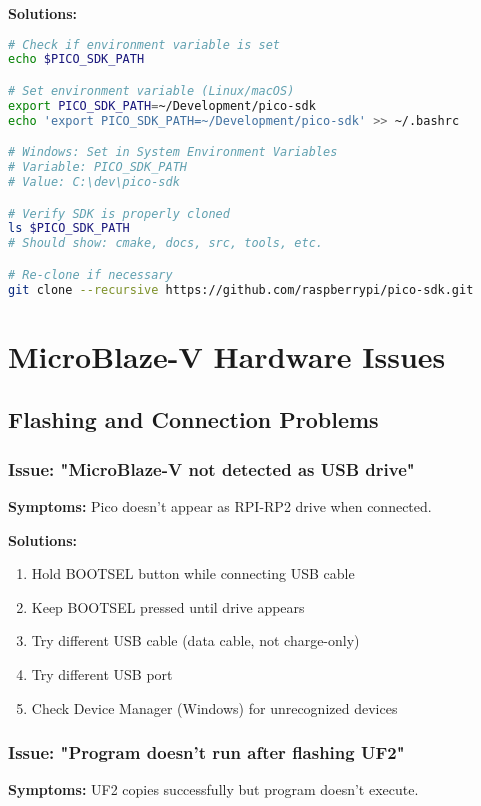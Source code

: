 \documentclass[11pt,a4paper]{article}
\begin{document}
\textbf{Solutions:}
\begin{lstlisting}[language=bash]
# Check if environment variable is set
echo $PICO_SDK_PATH

# Set environment variable (Linux/macOS)
export PICO_SDK_PATH=~/Development/pico-sdk
echo 'export PICO_SDK_PATH=~/Development/pico-sdk' >> ~/.bashrc

# Windows: Set in System Environment Variables
# Variable: PICO_SDK_PATH
# Value: C:\dev\pico-sdk

# Verify SDK is properly cloned
ls $PICO_SDK_PATH
# Should show: cmake, docs, src, tools, etc.

# Re-clone if necessary
git clone --recursive https://github.com/raspberrypi/pico-sdk.git
\end{lstlisting}

\section{MicroBlaze-V Hardware Issues}

\subsection{Flashing and Connection Problems}

\subsubsection{Issue: "MicroBlaze-V not detected as USB drive"}
\textbf{Symptoms:} Pico doesn't appear as RPI-RP2 drive when connected.

\textbf{Solutions:}
\begin{enumerate}
    \item Hold BOOTSEL button while connecting USB cable
    \item Keep BOOTSEL pressed until drive appears
    \item Try different USB cable (data cable, not charge-only)
    \item Try different USB port
    \item Check Device Manager (Windows) for unrecognized devices
\end{enumerate}

\subsubsection{Issue: "Program doesn't run after flashing UF2"}
\textbf{Symptoms:} UF2 copies successfully but program doesn't execute.
\end{document}
